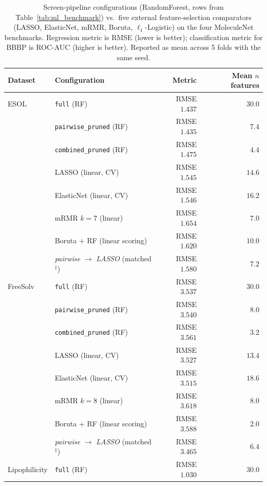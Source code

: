 \documentclass[STIX1COL]{WileyNJDv5}
\theoremstyle{definition}
\begin{document}
\begin{table}[h]
\centering
\small
\caption{Screen-pipeline configurations (RandomForest, rows from Table~\ref{tab:ml_benchmark}) vs.\ five external feature-selection comparators (LASSO, ElasticNet, mRMR, Boruta, $\ell_1$-Logistic) on the four MoleculeNet benchmarks. Regression metric is RMSE (lower is better); classification metric for BBBP is ROC-AUC (higher is better). Reported as mean across 5 folds with the same seed.}
\label{tab:fs_comparison}
\begin{tabular}{llrr}
\toprule
Dataset & Configuration & Metric & Mean $n$ features\\
\midrule
ESOL & \texttt{full} (RF)                 & RMSE $1.437$ & $30.0$\\
     & \texttt{pairwise\_pruned} (RF)     & RMSE $1.435$ & $\phantom{0}7.4$\\
     & \texttt{combined\_pruned} (RF)     & RMSE $1.475$ & $\phantom{0}4.4$\\
     & LASSO (linear, CV)                 & RMSE $1.545$ & $14.6$\\
     & ElasticNet (linear, CV)            & RMSE $1.546$ & $16.2$\\
     & mRMR $k{=}7$ (linear)              & RMSE $1.654$ & $\phantom{0}7.0$\\
     & Boruta + RF (linear scoring)       & RMSE $1.620$ & $10.0$\\
     & \emph{pairwise} $\to$ \emph{LASSO} (matched$^{\ddagger}$) & RMSE $1.580$ & $\phantom{0}7.2$\\
\midrule
FreeSolv & \texttt{full} (RF)             & RMSE $3.537$ & $30.0$\\
         & \texttt{pairwise\_pruned} (RF) & RMSE $3.540$ & $\phantom{0}8.0$\\
         & \texttt{combined\_pruned} (RF) & RMSE $3.561$ & $\phantom{0}3.2$\\
         & LASSO (linear, CV)             & RMSE $3.527$ & $13.4$\\
         & ElasticNet (linear, CV)        & RMSE $3.515$ & $18.6$\\
         & mRMR $k{=}8$ (linear)          & RMSE $3.618$ & $\phantom{0}8.0$\\
         & Boruta + RF (linear scoring)   & RMSE $3.588$ & $\phantom{0}2.0$\\
         & \emph{pairwise} $\to$ \emph{LASSO} (matched$^{\ddagger}$) & RMSE $3.465$ & $\phantom{0}6.4$\\
\midrule
Lipophilicity & \texttt{full} (RF)        & RMSE $1.030$ & $30.0$\\

\end{tabular}
\end{table}
\end{document}
